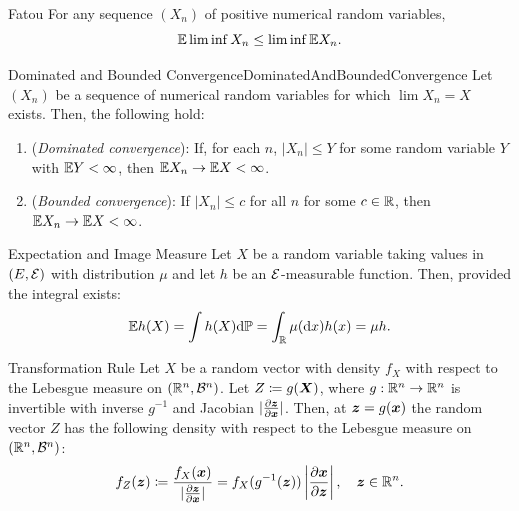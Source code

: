\begin{lem}{Fatou}{}
	For any sequence $(X_n)$ of positive numerical random variables,
	\begin{equation*}
		\mathbb{E} \liminf X_n \le \liminf \mathbb{E} X_n.
	\end{equation*}
\end{lem}

\begin{thm}{Dominated and Bounded Convergence}{DominatedAndBoundedConvergence}
	Let $(X_n)$ be a sequence of numerical random variables for which $\lim X_n = X$ exists. Then, the following hold:
	\begin{enumerate}
		\item (\textit{Dominated convergence}): If, for each $n$, $|X_n| \le Y$ for some random variable $Y$ with $\mathbb{E} Y < \infty$, then $\mathbb{E} X_n \to \mathbb{E} X < \infty$.
		\item (\textit{Bounded convergence}): If $|X_n| \le c$ for all $n$ for some $c \in \mathbb{R}$, then $\mathbb{E} X_n \to \mathbb{E} X < \infty$.
	\end{enumerate}
\end{thm}

\begin{thm}{Expectation and Image Measure}{}
	Let $X$ be a random variable taking values in $(E, \mathcal{E})$ with distribution $\mu$ and let $h$ be an $\mathcal{E}$-measurable function. Then, provided the integral exists:
	\begin{equation*}
		\mathbb{E} h(X) = \int h(X) \mathrm{d} \mathbb{P} = \int_{\mathbb{R}} \mu(\mathrm{d} x) h(x) = \mu h.
	\end{equation*}
\end{thm}

\begin{thm}{Transformation Rule}{}
	Let $X$ be a random vector with density $f_X$ with respect to the Lebesgue measure on $(\mathbb{R}^n, \mathcal{B}^n)$. Let $Z \coloneqq g(\boldsymbol{X})$, where $g: \mathbb{R}^n \to \mathbb{R}^n$ is invertible with inverse $g^{-1}$ and Jacobian $|\frac{\partial \boldsymbol{z}}{\partial \boldsymbol{x}}|$. Then, at $\boldsymbol{z} = g(\boldsymbol{x})$ the random vector $Z$ has the following density with respect to the Lebesgue measure on $(\mathbb{R}^n, \mathcal{B}^n)$:
	\begin{equation}
		f_Z(\boldsymbol{z}) \coloneqq \frac{f_X(\boldsymbol{x})}{|\frac{\partial \boldsymbol{z}}{\partial \boldsymbol{x}}|} = f_X(g^{-1}(\boldsymbol{z})) \left|\frac{\partial \boldsymbol{x}}{\partial \boldsymbol{z}}\right|, \quad \boldsymbol{z} \in \mathbb{R}^n.
		\label{eq:TransformationRuleDensity}
	\end{equation}
\end{thm}

